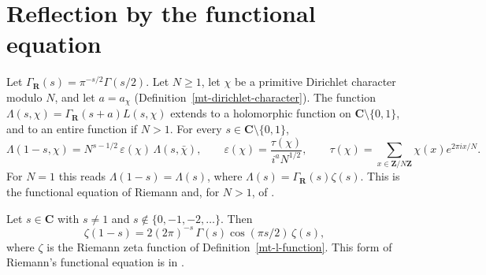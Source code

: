 \section{Reflection by the functional equation}\label{section-mt-functional-equation}

\begin{proposition}\label{mt-functional-equation}
Let $\Gamma_{\mathbf R}(s)=\pi^{-s/2}\Gamma(s/2)$. Let $N\geq1$, let $\chi$ be a primitive Dirichlet
character modulo $N$, and let $a=a_\chi$ (Definition~\ref{mt-dirichlet-character}). The function
$\Lambda(s,\chi)=\Gamma_{\mathbf R}(s+a)L(s,\chi)$ extends to a holomorphic function on
$\mathbf C\setminus\{0,1\}$, and to an entire function if $N>1$. For every
$s\in\mathbf C\setminus\{0,1\}$,
\[
 \Lambda(1-s,\chi)=N^{s-1/2}\,\varepsilon(\chi)\,\Lambda(s,\bar\chi),\qquad
 \varepsilon(\chi)=\frac{\tau(\chi)}{i^{a}N^{1/2}},\qquad
 \tau(\chi)=\sum_{x\in\mathbf Z/N\mathbf Z}\chi(x)e^{2\pi ix/N}.
\]
For $N=1$ this reads $\Lambda(1-s)=\Lambda(s)$, where $\Lambda(s)=\Gamma_{\mathbf R}(s)\zeta(s)$.
This is the functional equation of Riemann \cite{Rie59} and, for $N>1$, of
\cite[Chapter 9]{Dav00}.
\end{proposition}

\begin{proposition}\label{mt-zeta-functional-equation}
Let $s\in\mathbf C$ with $s\neq1$ and $s\notin\{0,-1,-2,\ldots\}$. Then
\[
 \zeta(1-s)=2(2\pi)^{-s}\,\Gamma(s)\cos(\pi s/2)\,\zeta(s),
\]
where $\zeta$ is the Riemann zeta function of Definition~\ref{mt-l-function}. This form of
Riemann's functional equation is in \cite[Chapter 2]{Tit86}.
\end{proposition}

